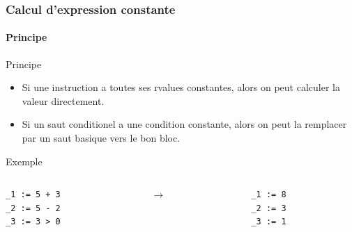 \documentclass{beamer}
\begin{document}
\begin{frame}[fragile]
    \frametitle{Calcul d'expression constante}
    \framesubtitle{Principe}

    \begin{block}{Principe}
        \begin{itemize}
            \item Si une instruction a toutes ses rvalues constantes, alors on peut calculer la valeur directement.
            \item Si un saut conditionel a une condition constante, alors on peut la remplacer
                  par un saut basique vers le bon bloc.
        \end{itemize}
    \end{block}
    \pause
    \begin{exampleblock}{Exemple}
         \begin{columns}
            \begin{column}{.40\textwidth}
                    \begin{lstlisting}
_1 := 5 + 3 
_2 := 5 - 2
_3 := 3 > 0
                    \end{lstlisting}
            \end{column}
            \pause
            \begin{column}{.04\textwidth}
                $\rightarrow$
            \end{column}
            \begin{column}{.40\textwidth}
                    \begin{lstlisting}
_1 := 8
_2 := 3
_3 := 1

                    \end{lstlisting}
            \end{column}
        \end{columns}       
    \end{exampleblock}
\end{frame}
\end{document}
